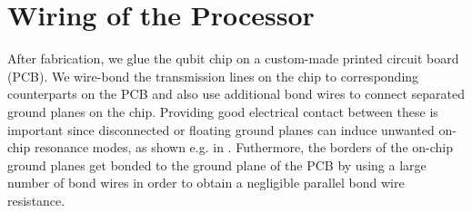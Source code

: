 \section{Wiring of the Processor}

After fabrication, we glue the qubit chip on a custom-made printed circuit board (PCB). We wire-bond the transmission lines on the chip to corresponding counterparts on the PCB and also use additional bond wires to connect separated ground planes on the chip. Providing good electrical contact between these is important since disconnected or floating ground planes can induce unwanted on-chip resonance modes, as shown e.g. in \citep{schuster_circuit_2007}. Futhermore, the borders of the on-chip ground planes get bonded to the ground plane of the PCB by using a large number of bond wires in order to obtain a negligible parallel bond wire resistance.